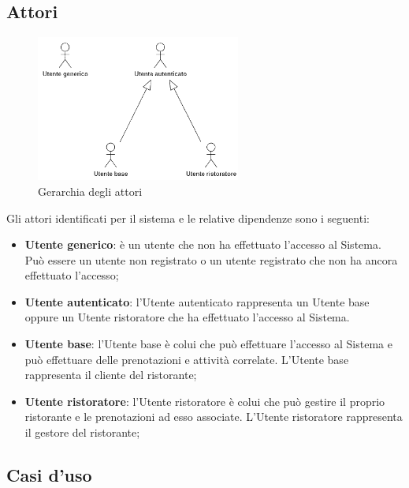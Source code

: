 \newpage
\subsection{Attori}

\begin{figure}[h]
	\centering
	\includegraphics[width=0.6\textwidth]{./uml/gerarchia_attori.png} 
	\caption{Gerarchia degli attori}
\end{figure}

Gli attori identificati per il sistema e le relative dipendenze sono i seguenti:
\begin{itemize}
	\item \textbf{Utente generico}: è un utente che non ha effettuato l'accesso al
	      Sistema. Può essere un utente non registrato o un utente registrato che non ha
	      ancora effettuato l'accesso;

	\item \textbf{Utente autenticato}: l'Utente autenticato rappresenta un Utente
	      base oppure un Utente ristoratore che ha effettuato l'accesso al Sistema.

	\item \textbf{Utente base}: l'Utente base è colui che può effettuare l'accesso al Sistema e può
	      effettuare delle prenotazioni e attività correlate. L'Utente base rappresenta
	      il cliente del ristorante;

	\item \textbf{Utente ristoratore}: l'Utente ristoratore è colui che può gestire il proprio ristorante e le
	      prenotazioni ad esso associate. L'Utente ristoratore rappresenta il gestore del
	      ristorante;
\end{itemize}

\newpage
\subsection{Casi d'uso}